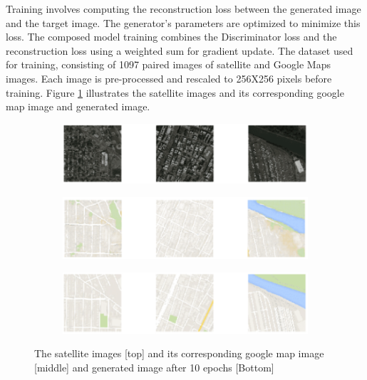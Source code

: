 \documentclass[12pt,twoside,a4paper,parskip]{scrbook} %
\begin{document}
Training involves computing the reconstruction loss between the generated image and the target image. The generator's parameters are optimized to minimize this loss. The composed model training combines the Discriminator loss and the reconstruction loss using a weighted sum for gradient update. The dataset used for training, consisting of 1097 paired images of satellite and Google Maps images. Each image is pre-processed and rescaled to 256X256 pixels before training. Figure \ref{fig:p2p} illustrates the satellite images and its corresponding google map image and generated image.
\begin{figure}[htb]
    \centering
    \begin{subfigure}{0.6\textwidth}
        \centering
        \includegraphics[width=\linewidth]{Images/pix2pix1.png}
    \end{subfigure}
    \hfill
    \begin{subfigure}{0.6\textwidth}
        \centering
        \includegraphics[width=\linewidth]{Images/pix2pix2.png}
    \end{subfigure}
    \hfill
    \begin{subfigure}{0.6\textwidth}
        \centering
        \includegraphics[width=\linewidth]{Images/pix2pix3.png}
    \end{subfigure}
    \caption[Frames of video generated by Pix2Pix GAN]{The satellite images [top] and its corresponding google map image [middle] and generated image after 10 epochs [Bottom]}
    \label{fig:p2p}
\end{figure}
\end{document}
